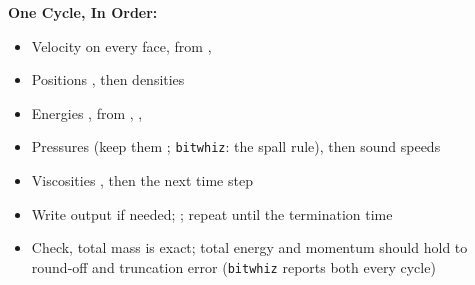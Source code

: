 \documentclass[11pt,addpoints]{exam}
\begin{document}
\begin{tcolorbox}[breakable]
\textbf{One Cycle, In Order:}\vspace{.5em}
\begin{itemize}
\item[a.] Velocity  on every face, from , 
\item[b.] Positions , then densities 
\item[c.] Energies , from , , 
\item[d.] Pressures  (keep them ; \texttt{bitwhiz}: the spall rule), then sound speeds 
\item[e.] Viscosities , then the next time step 
\item[f.] Write output if needed; ; repeat until the termination time\vspace{.5em}
\item Check, \hspace{3mm} total mass  is exact; total energy  and momentum  should hold to round-off and truncation error (\texttt{bitwhiz} reports both every cycle)
\end{itemize}
\end{tcolorbox}

\;\\
\end{document}
